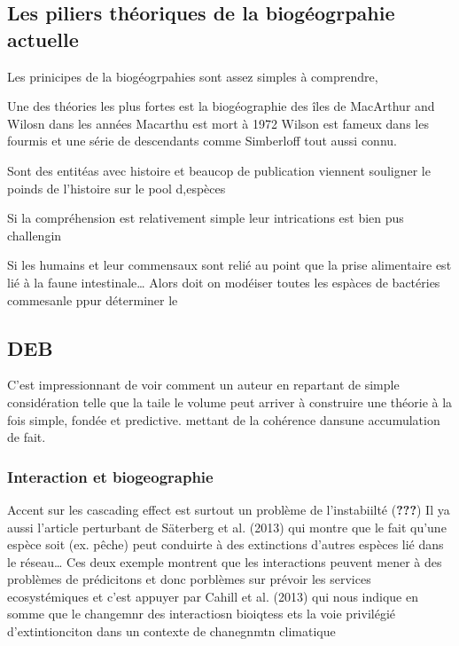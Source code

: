 \subsection{Les piliers théoriques de la biogéogrpahie
actuelle}\label{les-piliers-thuxe9oriques-de-la-bioguxe9ogrpahie-actuelle}

Les prinicipes de la biogéogrpahies sont assez simples à comprendre,

Une des théories les plus fortes est la biogéographie des îles de
MacArthur and Wilosn dans les années Macarthu est mort à 1972 Wilson est
fameux dans les fourmis et une série de descendants comme Simberloff
tout aussi connu.

Sont des entitéas avec histoire et beaucop de publication viennent
souligner le poinds de l'histoire sur le pool d,espèces

Si la compréhension est relativement simple leur intrications est bien
pus challengin

Si les humains et leur commensaux sont relié au point que la prise
alimentaire est lié à la faune intestinale\ldots{} Alors doit on
modéiser toutes les espàces de bactéries commesanle ppur déterminer le

\subsection{DEB}\label{deb}

C'est impressionnant de voir comment un auteur en repartant de simple
considération telle que la taile le volume peut arriver à construire une
théorie à la fois simple, fondée et predictive. mettant de la cohérence
dansune accumulation de fait.

\subsubsection{Interaction et
biogeographie}\label{interaction-et-biogeographie}

Accent sur les cascading effect est surtout un problème de l'instabiilté
({\textbf{???}}) Il ya aussi l'article perturbant de Säterberg et al.
(2013) qui montre que le fait qu'une espèce soit (ex. pêche) peut
conduirte à des extinctions d'autres espèces lié dans le réseau\ldots{}
Ces deux exemple montrent que les interactions peuvent mener à des
problèmes de prédicitons et donc porblèmes sur prévoir les services
ecosystémiques et c'est appuyer par Cahill et al. (2013) qui nous
indique en somme que le changemnr des interactiosn bioiqtess ets la voie
privilégié d'extintionciton dans un contexte de chanegnmtn climatique

